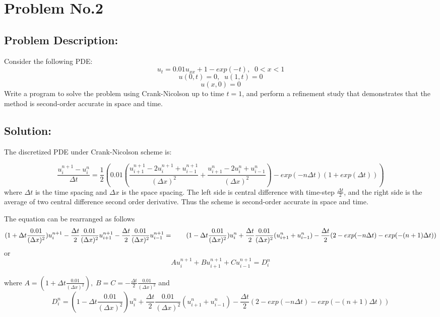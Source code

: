 \section{Problem No.2}
\subsection{Problem Description:} 
Consider the following PDE:
$$u_{t} = 0.01u_{xx}+1-exp(-t),\;\; 0<x<1$$
$$u(0,t) =0,\;\; u(1,t)=0$$
$$u(x,0)=0 $$
Write a program to solve the problem using Crank-Nicolson up to time $t=1$, and perform a refinement study that demonstrates that the method is second-order accurate in space and time. 

\subsection{Solution:} \label{prob2_sol}

The discretized PDE under Crank-Nicolson scheme is\cite{hoffmann2000computational}:

$$
\frac{u_{i}^{n+1}-u_{i}^{n}}{\Delta t} = \frac{1}{2} (0.01(\frac{u_{i+1}^{n+1} -2u_{i}^{n+1}+u_{i-1}^{n+1}}{(\Delta x)^{2}}+\frac{u_{i+1}^{n} -2u_{i}^{n}+u_{i-1}^{n}}{(\Delta x)^{2}}) - exp(-n\Delta t)(1+exp(\Delta t)))
$$
where $\Delta t$ is the time spacing and $\Delta x$ is the space spacing. The left side is central difference with time-step $\frac{ \Delta t}{2}$, and the right side is the average of two central difference second order derivative. Thus the scheme is second-order accurate in space and time. 

The equation can be rearranged as follows
$$
(1+\Delta t\frac{0.01}{(\Delta x)^{2}})u_{i}^{n+1} - \frac{\Delta t}{2}\frac{0.01}{(\Delta x)^{2}}u_{i+1}^{n+1}-\frac{\Delta t}{2}\frac{0.01}{(\Delta x)^{2}}u_{i-1}^{n+1} =
\\
\qquad (1-\Delta t \frac{0.01}{(\Delta x)^{2}})u_{i}^{n} + \frac{\Delta t}{2}\frac{0.01}{(\Delta x)^{2}}(u_{i+1}^{n} +u_{i-1}^{n}) - \frac{\Delta t}{2}(2-exp(-n\Delta t)-exp(-(n+1)\Delta t))
$$
or
$$
Au_{i}^{n+1} + Bu_{i+1}^{n+1} +Cu_{i-1}^{n+1} = D_{i}^{n}
$$
\vspace{0.2mm}

where $A = (1+\Delta t \frac{0.01}{(\Delta x)^{2}}), \; B=C=- \frac{\Delta t}{2}\frac{0.01}{(\Delta x)^{2}}$ and $$D_{i}^{n}=(1-\Delta t \frac{0.01}{(\Delta x)^{2}})u_{i}^{n} + \frac{\Delta t}{2}\frac{0.01}{(\Delta x)^{2}}(u_{i+1}^{n} +u_{i-1}^{n}) - \frac{\Delta t}{2}(2-exp(-n\Delta t)-exp(-(n+1)\Delta t))$$

